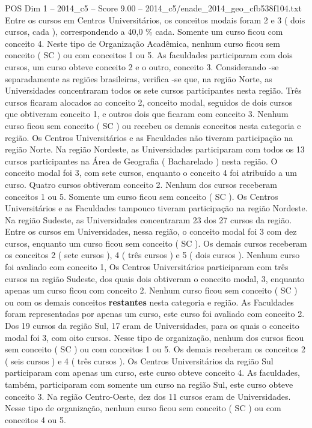 \begin{textsample}{POS Dim 1 – 2014\_c5 – Score 9.00 – 2014\_c5/enade\_2014\_geo\_cfb538f104.txt}
Entre os cursos em Centros Universitários, os conceitos modais foram 2 e 3 ( dois cursos, cada ), correspondendo a 40,0 \% cada.
Somente um curso ficou com conceito 4.
Neste tipo de Organização Acadêmica, nenhum curso ficou sem conceito ( SC ) ou com conceitos 1 ou 5.
As faculdades participaram com dois cursos, um curso obteve conceito 2 e o outro, conceito 3.
Considerando -se separadamente as regiões brasileiras, verifica -se que, na região Norte, as Universidades concentraram todos os sete cursos participantes nesta região.
Três cursos ficaram alocados ao conceito 2, conceito modal, seguidos de dois cursos que obtiveram conceito 1, e outros dois que ficaram com conceito 3.
Nenhum curso ficou sem conceito ( SC ) ou recebeu os demais conceitos nesta categoria e região.
Os Centros Universitários e as Faculdades não tiveram participação na região Norte.
Na região Nordeste, as Universidades participaram com todos os 13 cursos participantes na Área de Geografia ( Bacharelado ) nesta região.
O conceito modal foi 3, com sete cursos, enquanto o conceito 4 foi atribuído a um curso.
Quatro cursos obtiveram conceito 2.
Nenhum dos cursos receberam conceitos 1 ou 5.
Somente um curso ficou sem conceito ( SC ).
Os Centros Universitários e as Faculdades tampouco tiveram participação na região Nordeste.
Na região Sudeste, as Universidades concentraram 23 dos 27 cursos da região.
Entre os cursos em Universidades, nessa região, o conceito modal foi 3 com dez cursos, enquanto um curso ficou sem conceito ( SC ).
Os demais cursos receberam os conceitos 2 ( sete cursos ), 4 ( três cursos ) e 5 ( dois cursos ).
Nenhum curso foi avaliado com conceito 1, Os Centros Universitários participaram com três cursos na região Sudeste, dos quais dois obtiveram o conceito modal, 3, enquanto apenas um curso ficou com conceito 2.
Nenhum curso ficou sem conceito ( SC ) ou com os demais conceitos \textbf{restantes} nesta categoria e região.
As Faculdades foram representadas por apenas um curso, este curso foi avaliado com conceito 2.
Dos 19 cursos da região Sul, 17 eram de Universidades, para os quais o conceito modal foi 3, com oito cursos.
Nesse tipo de organização, nenhum dos cursos ficou sem conceito ( SC ) ou com conceitos 1 ou 5.
Os demais receberam os conceitos 2 ( seis cursos ) e 4 ( três cursos ).
Os Centros Universitários da região Sul participaram com apenas um curso, este curso obteve conceito 4.
As faculdades, também, participaram com somente um curso na região Sul, este curso obteve conceito 3.
Na região Centro-Oeste, dez dos 11 cursos eram de Universidades.
Nesse tipo de organização, nenhum curso ficou sem conceito ( SC ) ou com conceitos 4 ou 5.

\end{textsample}
